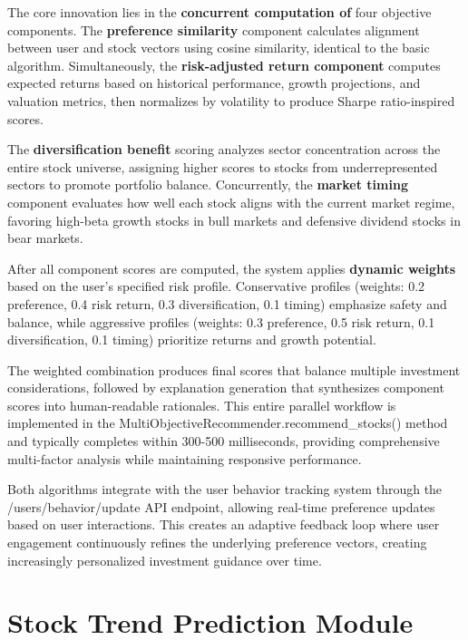 The core innovation lies in the \textbf{concurrent computation of} four objective components. The \textbf{preference similarity} component calculates alignment between user and stock vectors using cosine similarity, identical to the basic algorithm. Simultaneously, the \textbf{risk-adjusted return component} computes expected returns based on historical performance, growth projections, and valuation metrics, then normalizes by volatility to produce Sharpe ratio-inspired scores.

The \textbf{diversification benefit} scoring analyzes sector concentration across the entire stock universe, assigning higher scores to stocks from underrepresented sectors to promote portfolio balance. Concurrently, the \textbf{market timing} component evaluates how well each stock aligns with the current market regime, favoring high-beta growth stocks in bull markets and defensive dividend stocks in bear markets.

After all component scores are computed, the system applies \textbf{dynamic weights} based on the user's specified risk profile. Conservative profiles (weights: 0.2 preference, 0.4 risk return, 0.3 diversification, 0.1 timing) emphasize safety and balance, while aggressive profiles (weights: 0.3 preference, 0.5 risk return, 0.1 diversification, 0.1 timing) prioritize returns and growth potential.

The weighted combination produces final scores that balance multiple investment considerations, followed by explanation generation that synthesizes component scores into human-readable rationales. This entire parallel workflow is implemented in the MultiObjectiveRecommender.recommend\_stocks() method and typically completes within 300-500 milliseconds, providing comprehensive multi-factor analysis while maintaining responsive performance.

Both algorithms integrate with the user behavior tracking system through the /users/behavior/update API endpoint, allowing real-time preference updates based on user interactions. This creates an adaptive feedback loop where user engagement continuously refines the underlying preference vectors, creating increasingly personalized investment guidance over time.
\section{Stock Trend Prediction Module}

